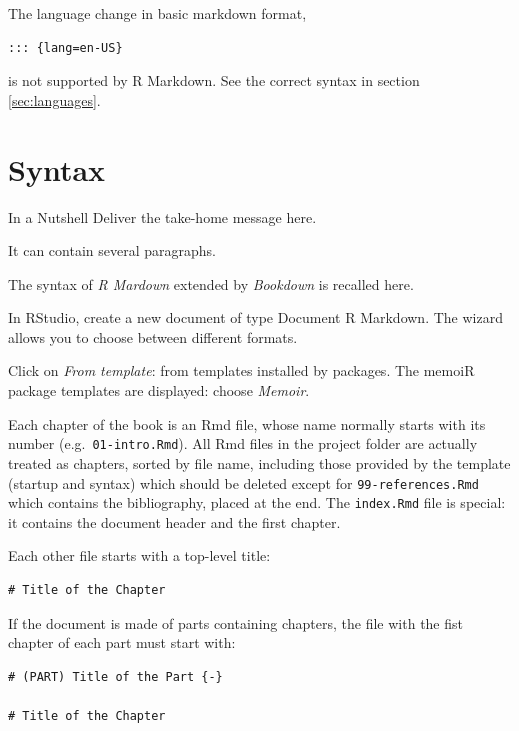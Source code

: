 \documentclass[
  12pt,
  american,
  a4paper,
  extrafontsizes,onecolumn,openright
  ]{memoir}
\newenvironment{Summary}
  {\begin{bclogo}[logo=\bctrombone, noborder=true, couleur=lightgray!50]{In a Nutshell}\parindent0pt}
  {\end{bclogo}}
\begin{document}
The language change in basic markdown format,

\begin{verbatim}
::: {lang=en-US}
\end{verbatim}

is not supported by R Markdown.
See the correct syntax in section \ref{sec:languages}.

\hypertarget{syntax}{%
\chapter{Syntax}\label{syntax}}

\scriptsize

\begin{Summary}
Deliver the take-home message here.

It can contain several paragraphs.
\end{Summary}

\normalsize

The syntax of \emph{R Mardown} extended by \emph{Bookdown} is recalled here.

In RStudio, create a new document of type Document R Markdown.
The wizard allows you to choose between different formats.

Click on \emph{From template}: from templates installed by packages.
The memoiR package templates are displayed: choose \emph{Memoir}.

Each chapter of the book is an Rmd file, whose name normally starts with its number (e.g.~\texttt{01-intro.Rmd}).
All Rmd files in the project folder are actually treated as chapters, sorted by file name, including those provided by the template (startup and syntax) which should be deleted except for \texttt{99-references.Rmd} which contains the bibliography, placed at the end.
The \texttt{index.Rmd} file is special: it contains the document header and the first chapter.

Each other file starts with a top-level title:

\begin{verbatim}
# Title of the Chapter
\end{verbatim}

If the document is made of parts containing chapters, the file with the fist chapter of each part must start with:

\begin{verbatim}
# (PART) Title of the Part {-}
  
# Title of the Chapter
\end{verbatim}
\end{document}
